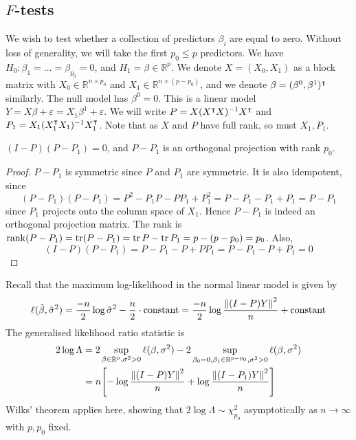 \subsection{\texorpdfstring{\( F \)}{F}-tests}
We wish to test whether a collection of predictors \( \beta_i \) are equal to zero.
Without loss of generality, we will take the first \( p_0 \leq p \) predictors.
We have \( H_0 \colon \beta_1 = \dots = \beta_{p_0} = 0 \), and \( H_1 = \beta \in \mathbb R^p \).
We denote \( X = (X_0, X_1) \) as a block matrix with \( X_0 \in \mathbb R^{n \times p_0} \) and \( X_1 \in \mathbb R^{n \times (p-p_0)} \), and we denote \( \beta = (\beta^0, \beta^1)^\intercal \) similarly.
The null model has \( \beta^0 = 0 \).
This is a linear model \( Y = X\beta + \varepsilon = X_1 \beta^1 + \varepsilon \).
We will write \( P = X(X^\intercal X)^{-1} X^\intercal \) and \( P_1 = X_1 (X_1^\intercal X_1)^{-1} X_1^\intercal \).
Note that as \( X \) and \( P \) have full rank, so must \( X_1, P_1 \).
\begin{lemma}
	\( (I-P)(P - P_1) = 0 \), and \( P - P_1 \) is an orthogonal projection with rank \( p_0 \).
\end{lemma}
\begin{proof}
	\( P - P_1 \) is symmetric since \( P \) and \( P_1 \) are symmetric.
	It is also idempotent, since
	\[
		(P-P_1)(P-P_1) = P^2 - P_1 P - P P_1 + P_1^2 = P - P_1 - P_1 + P_1 = P - P_1
	\]
	since \( P_1 \) projects onto the column space of \( X_1 \).
	Hence \( P - P_1 \) is indeed an orthogonal projection matrix.
	The rank is \( \rank(P - P_1) = \tr(P - P_1) = \tr P - \tr P_1 = p - (p - p_0) = p_0 \).
	Also,
	\[
		(I-P)(P-P_1) = P-P_1 - P + PP_1 = P-P_1 - P + P_1 = 0
	\]
\end{proof}
Recall that the maximum log-likelihood in the normal linear model is given by
\[
	\ell(\hat \beta, \hat \sigma^2) = \frac{-n}{2} \log \hat\sigma^2 - \frac{n}{2} \cdot \text{constant} = \frac{-n}{2} \log \frac{\norm{(I-P)Y}^2}{n} + \text{constant}
\]
The generalised likelihood ratio statistic is
\begin{align*}
	2 \log \Lambda & = 2 \sup_{\beta \in \mathbb R^p,\sigma^2>0} \ell(\beta, \sigma^2) - 2 \sup_{\beta_0 = 0, \beta_1 \in \mathbb R^{p-p_0},\sigma^2>0} \ell(\beta, \sigma^2) \\
	               & = n \qty[ -\log \frac{\norm{(I-P)Y}^2}{n} + \log \frac{\norm{(I-P_1)Y}^2}{n} ]
\end{align*}
Wilks' theorem applies here, showing that \( 2 \log \Lambda \sim \chi^2_{p_0} \) asymptotically as \( n \to \infty \) with \( p, p_0 \) fixed.

